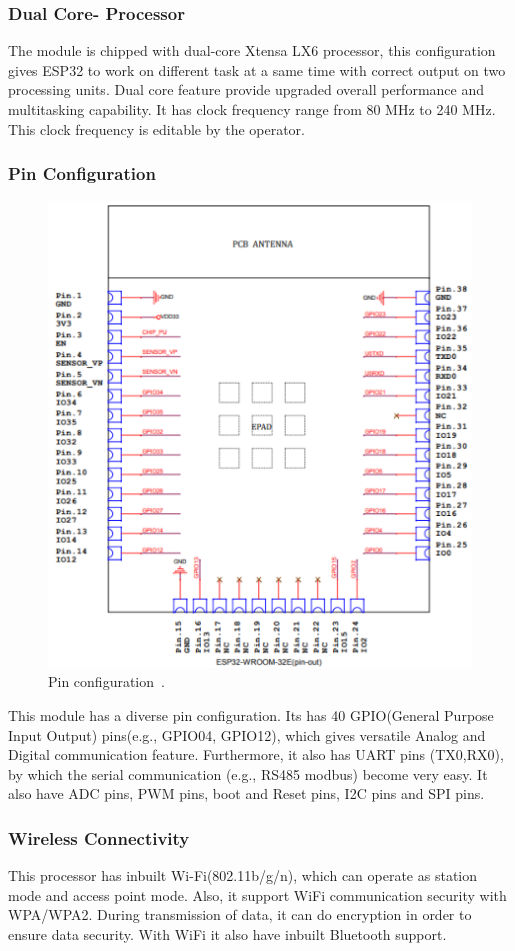 		\subsubsection{Dual Core- Processor}
			The module is chipped with dual-core Xtensa LX6 processor, this configuration gives ESP32 to work on different task at a same time with correct output on two processing units. Dual core feature provide upgraded overall performance and multitasking capability. It has clock frequency range from 80 MHz to 240 MHz. This clock frequency is editable by the operator. 
		
		\subsubsection{Pin Configuration}
			\begin{figure}[H]
				\centering
				\includegraphics[width=0.4\linewidth]{assets/DS-esp32-pin.png} 
				\caption{Pin configuration~\cite{esp-32-package}.}
			\end{figure}
			This module has a diverse pin configuration. Its has 40 GPIO(General Purpose Input Output) pins(e.g., GPIO04, GPIO12), which gives versatile Analog and Digital communication feature. Furthermore, it also has UART pins (TX0,RX0), by which the serial communication (e.g., RS485 modbus) become very easy. It also have ADC pins, PWM pins, boot and Reset pins, I2C pins and SPI pins.
		
		
		\subsubsection{Wireless Connectivity}
			This processor has inbuilt Wi-Fi(802.11b/g/n), which can operate as station mode and access point mode. Also, it support WiFi communication security with WPA/WPA2. During transmission of data, it can do encryption in order to ensure data security. With WiFi it also have inbuilt Bluetooth support. 
		
